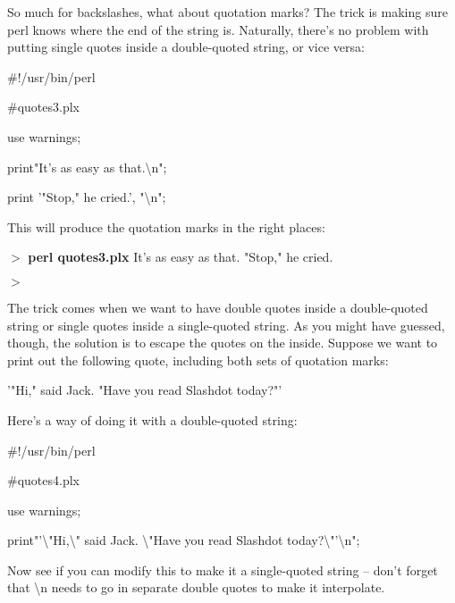 \documentclass[a4paper,11pt]{book}
\begin{document}
\noindent 

\noindent So much for backslashes, what about quotation marks? The trick is making sure perl knows where the end of the string is. Naturally, there's no problem with putting single quotes inside a double-quoted string, or vice versa:

\noindent 

\noindent 

\noindent \#!/usr/bin/perl

\noindent \#quotes3.plx

\noindent use warnings;

\noindent print"It's as easy as that.\textbackslash n";

\noindent print '"Stop," he cried.', "\textbackslash n";

\noindent 

\noindent This will produce the quotation marks in the right places:

\noindent 

\noindent $>$ \textbf{perl quotes3.plx }It's as easy as that. "Stop," he cried.

\noindent $>$

\noindent 

\noindent The trick comes when we want to have double quotes inside a double-quoted string or single quotes inside a single-quoted string. As you might have guessed, though, the solution is to escape the quotes on the inside. Suppose we want to print out the following quote, including both sets of quotation marks:

\noindent 

\noindent '"Hi," said Jack. "Have you read Slashdot today?"'

\noindent 

\noindent Here's a way of doing it with a double-quoted string:

\noindent 

\noindent 

\noindent \#!/usr/bin/perl

\noindent \#quotes4.plx

\noindent use warnings;

\noindent print"'\textbackslash "Hi,\textbackslash " said Jack. \textbackslash "Have you read Slashdot today?\textbackslash "'\textbackslash n";

\noindent 

\noindent Now see if you can modify this to make it a single-quoted string -- don't forget that \textbackslash n needs to go in separate double quotes to make it interpolate.
\end{document}
